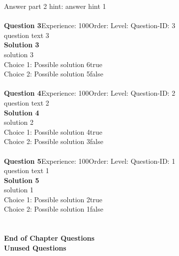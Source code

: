 \documentclass{article}
\begin{document}
Answer part 2 hint: \hspace{15pt}answer hint 1\\
\\[4pt]
\noindent\textbf{Question 3}\hspace{20pt}Experience: 100\hspace{20pt}Order: \hspace{20pt}Level: \hspace{20pt}Question-ID: 3\\[2pt]
question text 3\\[4pt]
\noindent\textbf{Solution 3}\\[2pt]
solution 3\\[4pt]
Choice 1: \hspace{20pt}Possible solution 6\hspace{20pt}true\\
Choice 2: \hspace{20pt}Possible solution 5\hspace{20pt}false\\
\\[4pt]
\noindent\textbf{Question 4}\hspace{20pt}Experience: 100\hspace{20pt}Order: \hspace{20pt}Level: \hspace{20pt}Question-ID: 2\\[2pt]
question text 2\\[4pt]
\noindent\textbf{Solution 4}\\[2pt]
solution 2\\[4pt]
Choice 1: \hspace{20pt}Possible solution 4\hspace{20pt}true\\
Choice 2: \hspace{20pt}Possible solution 3\hspace{20pt}false\\
\\[4pt]
\noindent\textbf{Question 5}\hspace{20pt}Experience: 100\hspace{20pt}Order: \hspace{20pt}Level: \hspace{20pt}Question-ID: 1\\[2pt]
question text 1\\[4pt]
\noindent\textbf{Solution 5}\\[2pt]
solution 1\\[4pt]
Choice 1: \hspace{20pt}Possible solution 2\hspace{20pt}true\\
Choice 2: \hspace{20pt}Possible solution 1\hspace{20pt}false\\
\\[4pt]
\\[2pt]
\noindent\large{\textbf{End of Chapter Questions}}\\[15pt]
\noindent\Huge{\textbf{Unused Questions}}\\[10pt]
\noindent\large{}\\
\end{document}
